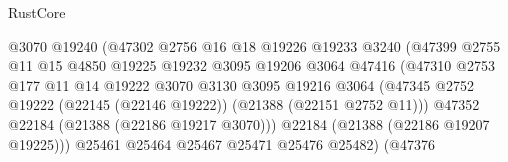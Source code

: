 \begin{lexlean}{RustCore}
\begin{coremodule}
                                          @3070
                                          @19240
                                          (@47302
                                            @2756
                                            @16
                                            @18
                                            @19226
                                            @19233
                                            @3240
                                            (@47399
                                              @2755
                                              @11
                                              @15
                                              @4850
                                              @19225
                                              @19232
                                              @3095
                                              @19206
                                              @3064
                                              @47416
                                              (@47310
                                                @2753
                                                @177
                                                @11
                                                @14
                                                @19222
                                                @3070
                                                @3130
                                                @3095
                                                @19216
                                                @3064
                                                (@47345
                                                  @2752
                                                  @19222
                                                  (@22145 (@22146 @19222))
                                                  (@21388 (@22151 @2752 @11)))
                                                @47352
                                                @22184
                                                (@21388 (@22186 @19217 @3070)))
                                              @22184
                                              (@21388 (@22186 @19207 @19225)))
                                            @25461
                                            @25464
                                            @25467
                                            @25471
                                            @25476
                                            @25482)
                                          (@47376

\end{coremodule}
\end{lexlean}
